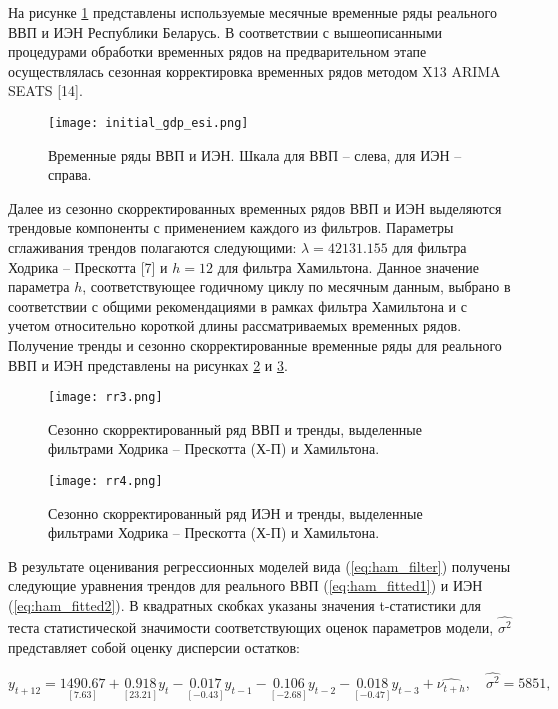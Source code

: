 \documentclass[a4paper,14pt]{extreport}
\begin{document}
	На рисунке \ref{fig:inital_gdp_esi} представлены используемые месячные временные ряды реального ВВП и ИЭН Республики Беларусь. В соответствии с вышеописанными процедурами обработки временных рядов на предварительном этапе осуществлялась сезонная корректировка временных рядов методом X13 ARIMA SEATS [14].
	
	
	\begin{figure}
		\label{fig:inital_gdp_esi}
		\texttt{[image: initial\_gdp\_esi.png]}
		\caption{
			Временные ряды ВВП и ИЭН. 
			Шкала для ВВП – слева, для ИЭН – справа. 
		}
	\end{figure} 

	Далее из сезонно скорректированных временных рядов ВВП и ИЭН выделяются трендовые компоненты с применением каждого из фильтров. Параметры сглаживания трендов полагаются следующими: $\lambda=42131.155$ для фильтра Ходрика – Прескотта [7] и $h=12$ для фильтра Хамильтона. Данное значение параметра $h$, соответствующее годичному циклу по месячным данным, выбрано в соответствии с общими рекомендациями в рамках фильтра Хамильтона и с учетом относительно короткой длины рассматриваемых временных рядов. Получение тренды и сезонно скорректированные временные ряды для реального ВВП и ИЭН представлены на рисунках \ref{fig:rr3} и \ref{fig:rr4}.
	
	\begin{figure}
		\label{fig:rr3}
		\texttt{[image: rr3.png]}
		\caption{
			Сезонно скорректированный ряд ВВП и тренды, 
			выделенные фильтрами Ходрика – Прескотта (Х-П) и Хамильтона. 
		}
	\end{figure}	

	\begin{figure}
		\label{fig:rr4}
		\texttt{[image: rr4.png]}
		\caption{
			Сезонно скорректированный ряд ИЭН и тренды, 
			выделенные фильтрами Ходрика – Прескотта (Х-П) и Хамильтона.
		}
	\end{figure}	

	В результате оценивания регрессионных моделей вида (\ref{eq:ham_filter}) получены следующие уравнения трендов для реального ВВП (\ref{eq:ham_fitted1}) и ИЭН (\ref{eq:ham_fitted2}). В квадратных скобках указаны значения t-статистики для теста статистической значимости соответствующих оценок параметров модели, $\hat{\sigma^2}$ представляет собой оценку дисперсии остатков:

	
	\begin{equation}
		y_{t+12} = \underset{[7.63]}{1490.67} 
		+ \underset{[23.21]}{0.918} y_{t}
		- \underset{[-0.43]}{0.017} y_{t-1}
		- \underset{[-2.68]}{0.106} y_{t-2}
		- \underset{[-0.47]}{0.018} y_{t-3}
		+ \hat{\nu_{t+h}}, \quad \hat{\sigma^2}=5851 ,
		\label{eq:ham_fitted1}
	\end{equation}
	
\end{document}
